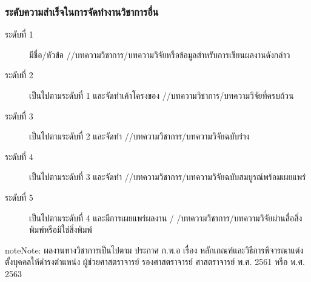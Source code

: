 \documentclass[a4paper,12pt,english]{sphinxmanual}
\begin{document}
\subsubsection{ระดับความสำเร็จในการจัดทำงานวิชาการอื่น}
\label{\detokenize{submission_part1:id16}}\begin{description}
\item[{ระดับที่ 1}] \leavevmode
มีชื่อ/หัวข้อ {\hyperref[\detokenize{glossary:term-3}]{}}/{\hyperref[\detokenize{glossary:term-2}]{}}/บทความวิชาการ/บทความวิจัยหรือข้อมูลสำหรับการเขียนผลงานดังกล่าว

\item[{ระดับที่ 2}] \leavevmode
เป็นไปตามระดับที่ 1 และจัดทำเค้าโครงของ {\hyperref[\detokenize{glossary:term-3}]{}}/{\hyperref[\detokenize{glossary:term-2}]{}}/บทความวิชาการ/บทความวิจัยที่ครบถ้วน

\item[{ระดับที่ 3}] \leavevmode
เป็นไปตามระดับที่ 2 และจัดทำ {\hyperref[\detokenize{glossary:term-3}]{}}/{\hyperref[\detokenize{glossary:term-2}]{}}/บทความวิชาการ/บทความวิจัยฉบับร่าง

\item[{ระดับที่ 4}] \leavevmode
เป็นไปตามระดับที่ 3 และจัดทำ {\hyperref[\detokenize{glossary:term-3}]{}}/{\hyperref[\detokenize{glossary:term-2}]{}}/บทความวิชาการ/บทความวิจัยฉบับสมบูรณ์พร้อมเผยแพร่

\item[{ระดับที่ 5}] \leavevmode
เป็นไปตามระดับที่ 4 และมีการเผยแพร่ผลงาน {\hyperref[\detokenize{glossary:term-3}]{}}/ {\hyperref[\detokenize{glossary:term-2}]{}}/บทความวิชาการ/บทความวิจัยผ่านสื่อสิ่งพิมพ์หรือมิใช่สิ่งพิมพ์

\end{description}

\begin{sphinxadmonition}{note}{Note:}
ผลงานทางวิชาการเป็นไปตาม ประกาศ ก.พ.อ เรื่อง หลักเกณฑ์และวิธีการพิจารณาแต่งตั้งบุคคลให้ดำรงตำแหน่ง ผู้ช่วยศาสตราจารย์ รองศาสตราจารย์ ศาสตราจารย์ พ.ศ. 2561 หรือ พ.ศ. 2563
\end{sphinxadmonition}
\end{document}
